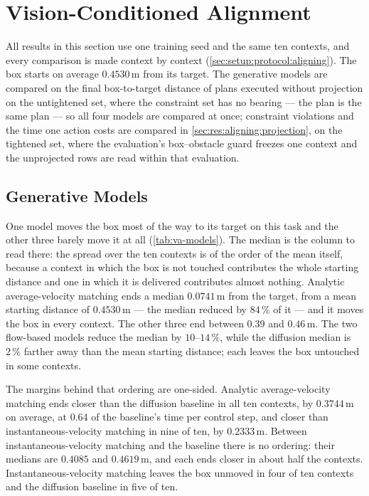 \section{Vision-Conditioned Alignment}\label{sec:res:visual}

All results in this section use one training seed and the same ten contexts, and every comparison is made
context by context (\autoref{sec:setup:protocol:aligning}). The box starts on average $0.4530$\,m
from its target. The generative models are compared on the final box-to-target distance of plans executed
without projection on the untightened set, where the constraint set has no bearing --- the plan is the
same plan --- so all four models are compared at once; constraint violations and the time one action costs
are compared in \autoref{sec:res:aligning:projection}, on the tightened set, where the evaluation's
box--obstacle guard freezes one context and the unprojected rows are read within that evaluation.

\subsection{Generative Models}\label{sec:res:aligning:models}

One model moves the box most of the way to its target on this task and the other three barely move it at all
(\autoref{tab:va-models}). The median is the column to read there: the spread over the ten contexts is
of the order of the mean itself, because a context in which the box is not touched contributes the whole
starting distance and one in which it is delivered contributes almost nothing. Analytic average-velocity matching ends a median $0.0741$\,m from the target,
from a mean starting distance of $0.4530$\,m --- the median reduced by $84\,\%$ of it --- and it moves the box in every context. The other three end between $0.39$ and $0.46$\,m. The two
flow-based models reduce the median by $10$--$14\,\%$, while the diffusion median is $2\,\%$ farther
away than the mean starting distance; each leaves the box untouched in some contexts.

The margins behind that ordering are one-sided. Analytic average-velocity matching ends closer than the
diffusion baseline in all ten contexts, by $0.3744$\,m on average, at $0.64$ of the baseline's time per
control step, and closer than instantaneous-velocity matching in nine of ten, by $0.2333$\,m. Between
instantaneous-velocity matching and the baseline there is no ordering: their medians are $0.4085$ and
$0.4619$\,m, and each ends closer in about half the contexts. Instantaneous-velocity matching leaves the
box unmoved in four of ten contexts and the diffusion baseline in five of ten.

